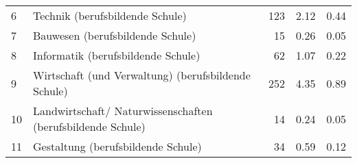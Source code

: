 \begin{longtable}{lXrrr}
     6 &
     \multicolumn{1}{X}{ Technik (berufsbildende Schule)   } &


       \num{123} &
       \num[round-mode=places,round-precision=2]{2.12} &
         \num[round-mode=places,round-precision=2]{0.44} \\

     7 &
     \multicolumn{1}{X}{ Bauwesen (berufsbildende Schule)   } &


       \num{15} &
       \num[round-mode=places,round-precision=2]{0.26} &
         \num[round-mode=places,round-precision=2]{0.05} \\

     8 &
     \multicolumn{1}{X}{ Informatik (berufsbildende Schule)   } &


       \num{62} &
       \num[round-mode=places,round-precision=2]{1.07} &
         \num[round-mode=places,round-precision=2]{0.22} \\

     9 &
     \multicolumn{1}{X}{ Wirtschaft (und Verwaltung) (berufsbildende Schule)   } &


       \num{252} &
       \num[round-mode=places,round-precision=2]{4.35} &
         \num[round-mode=places,round-precision=2]{0.89} \\

     10 &
     \multicolumn{1}{X}{ Landwirtschaft/ Naturwissenschaften (berufsbildende Schule)   } &


       \num{14} &
       \num[round-mode=places,round-precision=2]{0.24} &
         \num[round-mode=places,round-precision=2]{0.05} \\

     11 &
     \multicolumn{1}{X}{ Gestaltung (berufsbildende Schule)   } &


       \num{34} &
       \num[round-mode=places,round-precision=2]{0.59} &
         \num[round-mode=places,round-precision=2]{0.12} \\


\end{longtable}
